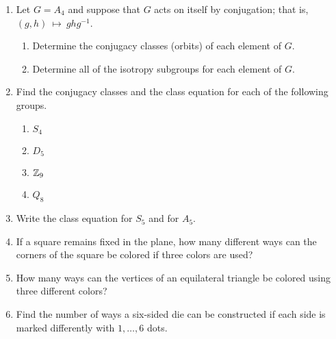 {\begin{enumerate}
\begin{enumerate}
 \item
Describe geometrically the orbit containing $P$.
 
 \item
Find the group $G_P$.
 
\end{enumerate}
 
 
\item
Let $G =  A_4$ and suppose that $G$ acts on itself by conjugation;
that is, $(g,h)~\mapsto~ghg^{-1}$. 
\begin{enumerate}
 
 \item
Determine the conjugacy classes (orbits) of each element of $G$.
 
 \item
Determine all of the isotropy subgroups for each element of $G$.
 
\end{enumerate}
 
 
\item
Find the conjugacy classes and the class equation for each of the
following groups. 
\begin{multicols}{2}
\begin{enumerate}

\item
$S_4$

\item
$D_5$

\item
${\Bbb Z}_9$

\item
$Q_8$


\end{enumerate}
\end{multicols}
 

 
 
\item  %
Write the class equation for $S_5$ and for $A_5$.
 
 
\item
If a square remains fixed in the plane, how many different ways can
the corners of the square be colored if three colors are used?
 
 
\item
How many ways can the vertices of an equilateral triangle be colored
using three different colors? 
 
 
\item
Find the number of ways a six-sided die can be constructed if each
side is  marked differently with $1, \ldots, 6$ 
dots.
 

\end{enumerate}}

